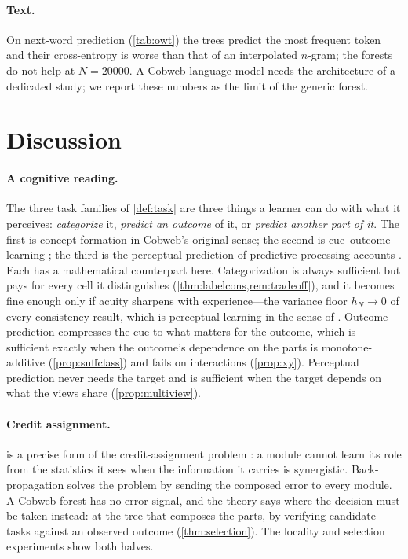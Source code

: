 \documentclass[11pt]{article}
\theoremstyle{definition}
\theoremstyle{remark}
\begin{document}
\paragraph{Text.}
On next-word prediction (\cref{tab:owt}) the trees predict the most frequent token and
their cross-entropy is worse than that of an interpolated $n$-gram; the forests do not
help at $N=20000$.  A Cobweb language model needs the architecture of a dedicated study;
we report these numbers as the limit of the generic forest.

\section{Discussion}\label{sec:discussion}

\paragraph{A cognitive reading.}
The three task families of \cref{def:task} are three things a learner can do with what it
perceives: \emph{categorize} it, \emph{predict an outcome} of it, or \emph{predict
another part of it}.  The first is concept formation in Cobweb's original sense; the
second is cue--outcome learning \citep{rescorla1972}; the third is the perceptual
prediction of predictive-processing accounts \citep{clark2013}.  Each has a mathematical
counterpart here.  Categorization is always sufficient but pays for every cell it
distinguishes (\cref{thm:labelcons,rem:tradeoff}), and it becomes fine enough only if
acuity sharpens with experience---the variance floor $h_N\to0$ of every consistency result,
which is perceptual learning in the sense of \citet{goldstone1998}.  Outcome prediction
compresses the cue to what matters for the outcome, which is sufficient exactly when the
outcome's dependence on the parts is monotone-additive (\cref{prop:suffclass}) and fails
on interactions (\cref{prop:xy}).  Perceptual prediction never needs the target and is
sufficient when the target depends on what the views share (\cref{prop:multiview}).

\paragraph{Credit assignment.}
 is a precise form of the credit-assignment problem
\citep{minsky1961}: a module cannot learn its role from the statistics it sees when the
information it carries is synergistic.  Back-propagation solves the problem by sending
the composed error to every module.  A Cobweb forest has no error signal, and the theory
says where the decision must be taken instead: at the tree that composes the parts, by
verifying candidate tasks against an observed outcome (\cref{thm:selection}).  The
locality and selection experiments show both halves.
\end{document}
